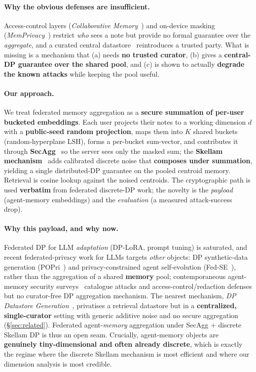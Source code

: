 \documentclass[pdflatex,sn-mathphys-num,iicol]{sn-jnl}
\theoremstyle{thmstyleone}%
\theoremstyle{thmstyletwo}%
\theoremstyle{thmstylethree}%
\newcommand{\secref}[1]{\S\ref{#1}}
\begin{document}
\paragraph{Why the obvious defenses are insufficient.}
Access-control layers (\emph{Collaborative Memory}~\cite{rezazadeh2025collabmem})
and on-device masking (\emph{MemPrivacy}~\cite{chen2026memprivacy}) restrict
\emph{who} sees a note but provide no formal guarantee over the \emph{aggregate},
and a curated central datastore~\cite{abouelenein2026dpdatastore} reintroduces a
trusted party. What is missing is a mechanism that (a) needs \textbf{no trusted
curator}, (b) gives a \textbf{central-DP guarantee over the shared pool}, and
(c) is shown to actually \textbf{degrade the known attacks} while keeping the
pool useful.

\paragraph{Our approach.}
We treat federated memory aggregation as a \textbf{secure summation of per-user
bucketed embeddings}. Each user projects their notes to a working dimension $d$
with a \textbf{public-seed random projection}, maps them into $K$ shared buckets
(random-hyperplane LSH), forms a per-bucket sum-vector, and contributes it
through \textbf{SecAgg}~\cite{bonawitz2017secagg} so the server sees only the
masked sum; the \textbf{Skellam mechanism}~\cite{agarwal2021skellam} adds
calibrated discrete noise that \textbf{composes under summation}, yielding a
single distributed-DP guarantee on the pooled centroid memory. Retrieval is
cosine lookup against the noised centroids. The cryptographic path is used
\textbf{verbatim} from federated discrete-DP work; the novelty is the
\emph{payload} (agent-memory embeddings) and the \emph{evaluation} (a measured
attack-success drop).

\paragraph{Why this payload, and why now.}
Federated DP for LLM \emph{adaptation} (DP-LoRA, prompt tuning) is saturated,
and recent federated-privacy work for LLMs targets \emph{other} objects: DP
synthetic-data generation (POPri~\cite{hou2025popri}) and privacy-constrained
agent self-evolution (Fed-SE~\cite{chen2025fedse}), rather than the
aggregation of a shared \textbf{memory} pool; contemporaneous agent-memory
security surveys~\cite{lin2026survey} catalogue attacks and
access-control/redaction defenses but no curator-free DP aggregation mechanism.
The nearest mechanism, \emph{DP Datastore
Generation}~\cite{abouelenein2026dpdatastore}, privatises a retrieval datastore
but in a \textbf{centralized, single-curator} setting with generic additive noise
and no secure aggregation (\secref{sec:related}). Federated agent-\emph{memory}
aggregation under SecAgg $+$ discrete Skellam DP is thus an open seam. Crucially,
agent-memory objects are \textbf{genuinely tiny-dimensional and often already
discrete}, which is exactly the regime where the discrete Skellam mechanism is
most efficient and where our dimension analysis is most credible.
\end{document}
